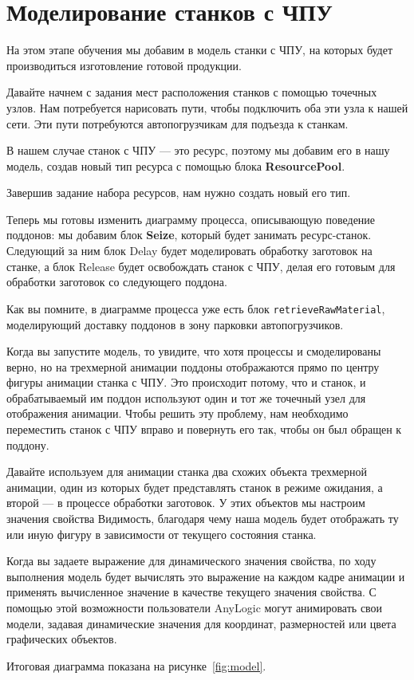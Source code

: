 \section{Моделирование станков с ЧПУ}
На этом этапе обучения мы добавим в модель станки с ЧПУ, на которых будет
производиться изготовление готовой продукции.\par
Давайте начнем с задания мест расположения станков с помощью точечных
узлов. Нам потребуется нарисовать пути, чтобы подключить оба эти узла к нашей
сети. Эти пути потребуются автопогрузчикам для подъезда к станкам.\par
В нашем случае станок с ЧПУ --- это ресурс, поэтому мы добавим его в нашу
модель, создав новый тип ресурса с помощью блока \textbf{ResourcePool}.\par
Завершив задание набора ресурсов, нам нужно создать новый его тип.\par
Теперь мы готовы изменить диаграмму процесса, описывающую поведение
поддонов: мы добавим блок \textbf{Seize}, который будет занимать
ресурс-станок. Следующий за ним блок Delay будет моделировать обработку
заготовок на станке, а блок Release будет освобождать станок с ЧПУ,
делая его готовым для обработки заготовок со следующего поддона.\par
Как вы помните, в диаграмме процесса уже есть блок
\texttt{retrieveRawMaterial},
моделирующий доставку поддонов в зону парковки автопогрузчиков.\par
Когда вы запустите модель, то увидите, что хотя процессы и смоделированы
верно, но на трехмерной анимации поддоны отображаются прямо по центру
фигуры анимации станка с ЧПУ. Это происходит потому, что и станок, и
обрабатываемый им поддон используют один и тот же точечный узел для
отображения анимации. Чтобы решить эту проблему, нам необходимо
переместить станок с ЧПУ вправо и повернуть его так, чтобы он был обращен к
поддону.\par
Давайте используем для анимации станка два схожих объекта трехмерной
анимации, один из которых будет представлять станок в режиме ожидания, а
второй --- в процессе обработки заготовок. У этих объектов мы настроим
значения свойства Видимость, благодаря чему наша модель будет отображать
ту или иную фигуру в зависимости от текущего состояния станка.\par
Когда вы задаете выражение для динамического значения свойства, по ходу
выполнения модель будет вычислять это выражение на каждом кадре анимации
и применять вычисленное значение в качестве текущего значения свойства. С
помощью этой возможности пользователи AnyLogic могут анимировать свои
модели, задавая динамические значения для координат, размерностей или
цвета графических объектов.\par
Итоговая диаграмма показана на рисунке~\ref{fig:model}.

